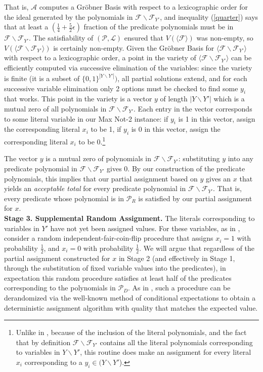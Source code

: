 \documentclass{article}
\begin{document}
That is, $\mathcal{A}$ computes a Gr\"{o}bner Basis with respect to a lexicographic order for the ideal generated by the polynomials in $\mathcal{F}\backslash \mathcal{F}_{Y'}$, and inequality (\ref{quarter}) says that at least a $(\frac{1}{4}+\frac{5}{2}\epsilon)$ fraction of the predicate polynomials must be in $\mathcal{F}\backslash \mathcal{F}_{Y'}$. The satisfiability of $(\mathcal{P}, \mathcal{L})$ ensured that $V(\langle \mathcal{F}\rangle)$ was non-empty, so $V(\langle \mathcal{F}\backslash \mathcal{F}_{Y'}\rangle)$ is certainly non-empty.
Given the Gr\"{o}bner Basis for $\langle\mathcal{F}\backslash \mathcal{F}_{Y'}\rangle$ with respect to a lexicographic order, a point in the variety of $\langle\mathcal{F}\backslash \mathcal{F}_{Y'}\rangle$ can be efficiently computed via successive elimination of the variables: since the variety is finite (it is a subset of $\{0,1\}^{|Y\backslash Y'|})$, all partial solutions extend, and for each successive variable elimination only 2 options must be checked to find some $y_i$ that works. This point in the variety is a vector $y$ of length $|Y\backslash Y'|$ which is a mutual zero of all polynomials in $\mathcal{F}\backslash \mathcal{F}_{Y'}$. Each entry in the vector corresponds to some literal variable in our Max Not-2 instance: if $y_i$ is 1 in this vector, assign the corresponding literal $x_i$ to be 1, if $y_i$ is 0 in this vector, assign the corresponding literal $x_i$ to be 0.\footnote{Unlike in \citep{RS}, because of the inclusion of the literal polynomials, and the fact that by definition $\mathcal{F}\backslash \mathcal{F}_{Y'}$ contains all the literal polynomials corresponding to variables in $Y\backslash Y'$, this routine does make an assignment for every literal $x_i$ corresponding to a  $y_i \in (Y\backslash Y'$).} 

The vector $y$ is a mutual zero of polynomials in $\mathcal{F}\backslash \mathcal{F}_{Y'}$: substituting $y$ into any predicate polynomial
in $\mathcal{F}\backslash \mathcal{F}_{Y'}$ gives 0. By our construction of the predicate polynomials, this implies that our partial assignment based on $y$ gives an $x$ that yields an \textit{acceptable total} for every predicate polynomial in $\mathcal{F}\backslash \mathcal{F}_{Y'}$. That is, every predicate whose polynomial is in $\mathcal{P}_R$ is satisfied by our partial assignment for $x$.\\

\noindent \textbf{Stage 3. Supplemental Random Assignment.} The literals corresponding to variables in $Y'$ have not yet been assigned values. For these variables, as in \citep{RS}, consider a random independent-fair-coin-flip procedure that assigns $x_i=1$ with probability $\frac{1}{2}$, and $x_i=0$ with probability $\frac{1}{2}$. We will argue that regardless of the partial assignment constructed for $x$ in Stage 2 (and effectively in Stage 1, through the substitution of fixed variable values into the predicates), in expectation this random procedure satisfies at least half of the predicates corresponding to the polynomials in $\mathcal{P}_D$. As in \citep{RS}, such a procedure can be derandomized via the well-known method of conditional expectations to obtain a deterministic assignment algorithm with quality that matches the expected value.
\end{document}
